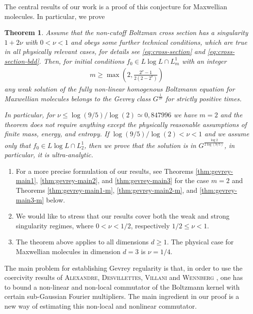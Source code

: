 \documentclass[11pt,a4paper,reqno]{amsart}
\theoremstyle{plain}
\newtheorem*{theorem*}{Theorem}
\theoremstyle{definition}
\begin{document}
   The central results of our work is a proof of this conjecture for Maxwellian molecules. In particular, we prove
   \begin{theorem*} Assume that the non-cutoff Boltzman cross section has a singularity $1+2\nu$ with $0<\nu<1$ and obeys some further technical conditions, which are true in all physically relevant cases, for details see \eqref{eq:cross-section} and \eqref{eq:cross-section-bdd}. Then, for initial conditions $f_0\in L\log L\cap L^1_m$ with an integer
   		\begin{align*}
   			m\ge \max\left(2,\frac{2^\nu-1}{2(2-2^{\nu})}\right)
   		\end{align*}
   		any weak solution of the fully non-linear homogenous Boltzmann equation for Maxwellian molecules belongs to the Gevrey class $G^{\frac{1}{2\nu}}$ for strictly positive times.

   		In particular, for $\nu \le \log(9/5)/\log(2) \simeq 0,847996$ we have
   		$m=2$ and the theorem does not require anything except the physically reasonable assumptions of finite mass, energy, and entropy. If $\log(9/5)/\log(2)<\nu<1$ and we assume only that $f_0\in L\log L\cap L^1_2$, then we prove that the solution is in $G^{\frac{\log2}{2\log(9/5)}}$, in particular, it is ultra-analytic.
   \end{theorem*}

 \begin{enumerate}
 	\item For a more precise formulation of our results, see Theorems \ref{thm:gevrey-main1}, \ref{thm:gevrey-main2}, and \ref{thm:gevrey-main3} for the case $m=2$ and Theorems \ref{thm:gevrey-main1-m},  \ref{thm:gevrey-main2-m}, and \ref{thm:gevrey-main3-m} below.
 	\item We would like to stress that our results cover both the weak and strong singularity regimes, where $0<\nu<1/2$, respectively $1/2\le \nu<1$.
 	\item The theorem above applies to all dimensions $d\geq 1$. The physical case for Maxwellian molecules in dimension $d=3$ is $\nu=1/4$.
 \end{enumerate}

   The main problem for establishing Gevrey regularity is that, in order to use the coercivity results of \textsc{Alexandre, Desvillettes, Villani} and \textsc{Wennberg} \cite{ADVW00}, one has to bound a non-linear and non-local commutator of the Boltzmann kernel with certain sub-Gaussian Fourier multipliers.
   The main ingredient in our proof is a new way of estimating this non-local and nonlinear commutator.
   	
\end{document}
